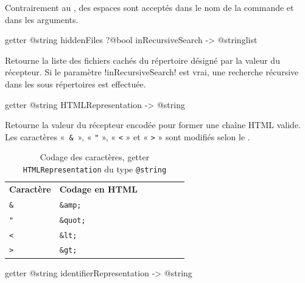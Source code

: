 Contrairement au , des espaces sont acceptés dans le nom de la commande et dans les arguments.









\begin{galgas4box}
getter @string hiddenFiles ?@bool inRecursiveSearch -> @stringlist
\end{galgas4box}

Retourne la liste des fichiers cachés du répertoire désigné par la valeur du récepteur. Si le paramètre \ggsq!inRecursiveSearch! est vrai, une recherche récursive dans les sous répertoires est effectuée.











\begin{galgas4box}
getter @string HTMLRepresentation -> @string
\end{galgas4box}
Retourne la valeur du récepteur encodée pour former une chaîne HTML valide. Les caractères «~\texttt{\&}~», « \texttt{"} », « \texttt{<} » et « \texttt{>} » sont modifiés selon le .


\begin{table}[t]
  \centering
  \begin{tabular}{lllllll}
  \textbf{Caractère} & \textbf{Codage en HTML} \\
  \texttt{\&} & \texttt{\&amp;} \\
  \texttt{"} & \texttt{\&quot;} \\
  \texttt{<} & \texttt{\&lt;} \\
  \texttt{>} & \texttt{\&gt;} \\
  \end{tabular}
  \caption{Codage des caractères, getter \texttt{HTMLRepresentation} du type \texttt{@string}}
\end{table}







\begin{galgas4box}
getter @string identifierRepresentation -> @string
\end{galgas4box}

